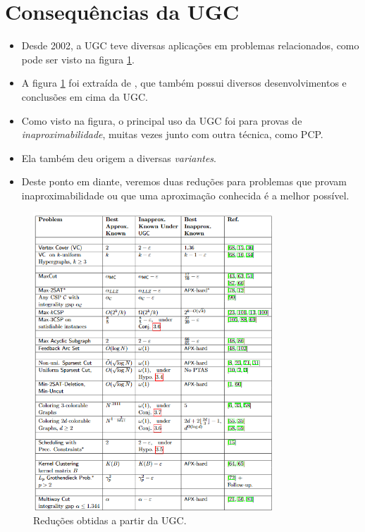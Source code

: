 \documentclass[12pt,a4paper]{article}
\begin{document}
\section{Consequências da UGC}
\begin{itemize}
    \item Desde 2002, a UGC teve diversas aplicações em problemas relacionados, como pode ser visto na figura \ref{fig:reducoes}.
    \item A figura \ref{fig:reducoes} foi extraída de \cite{survey}, que também possui diversos desenvolvimentos e conclusões em cima da UGC.
    \item Como visto na figura, o principal uso da UGC foi para provas de \emph{inaproximabilidade}, muitas vezes junto com outra técnica, como PCP.
    \item Ela também deu origem a diversas \emph{variantes}.
    \item Deste ponto em diante, veremos duas reduções para problemas que provam inaproximabilidade ou que uma aproximação conhecida é a melhor possível.
\end{itemize}

\begin{figure}
    \centering
    \includegraphics[width=0.8\textwidth]{reducoes.png}
    \caption{Reduções obtidas a partir da UGC.}
    \label{fig:reducoes}
\end{figure}
\end{document}
